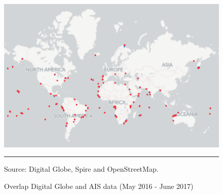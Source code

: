 \begin{figure}[h]
	\centering \caption{Overlap Digital Globe and AIS data (May 2016 - June 2017)}\label{overlap}
\includegraphics[width=0.6\linewidth]{images/overlap_gbdx.png} 
\begin{flushleft}
\rule{1.2in}{0em} \scriptsize Source: Digital Globe, Spire and OpenStreetMap. \\
\par
\end{flushleft}
\end{figure}


